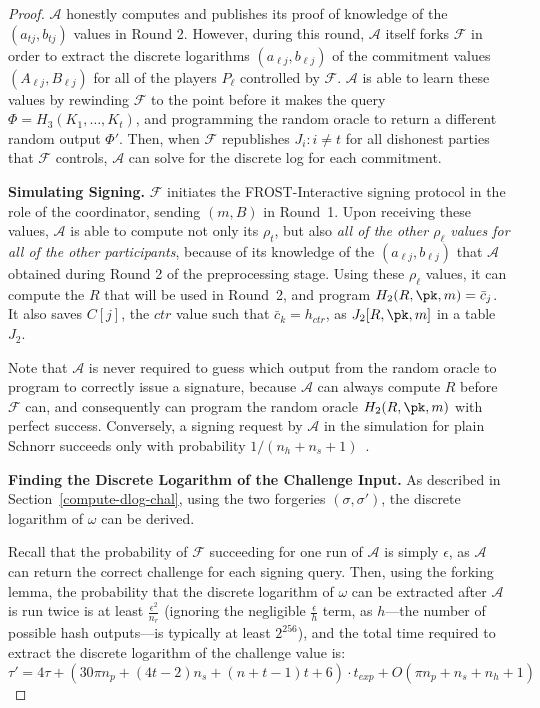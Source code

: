 \begin{proof}
$\mathcal{A}$ honestly computes and  publishes its proof of knowledge of the $(a_{tj}, b_{tj})$ values in Round 2.
However, during this round, $\mathcal{A}$ itself forks $\mathcal{F}$ in order
to extract the discrete logarithms
$(a_{\ell j}, b_{\ell j})$
of the commitment values
$(A_{\ell j}, B_{\ell j})$ for all of the players
$P_\ell$ controlled by $\mathcal{F}$.
$\mathcal{A}$ is able to learn these values
by rewinding $\mathcal{F}$ to the point before it makes the query
$\Phi = H_3(K_1, \dots, K_t)$, and programming the random oracle to
return a different random output $\Phi'$. Then, when $\mathcal{F}$ republishes
$J_i : i \neq t$ for all dishonest parties that $\mathcal{F}$ controls,
$\mathcal{A}$ can solve for the discrete log for each commitment.

\textbf{Simulating Signing.}
$\mathcal{F}$ initiates the FROST-Interactive signing protocol in the role of the coordinator,
sending $(m, B)$ in Round~1. Upon receiving these values, $\mathcal{A}$ is
able to compute not only its $\rho_t$, but also \emph{all of the other $\rho_\ell$
values for all of the other participants}, because of its knowledge of
the $(a_{\ell j}, b_{\ell j})$ that $\mathcal{A}$ obtained during
Round 2 of the preprocessing stage.  Using these $\rho_\ell$ values, it can
compute the $R$ that will be used in Round~2, and program $H_2(R, \pk, m) =
\bar{c}_j$. It also saves $C[j]$, the $ctr$ value such that $\bar{c}_k =
h_{ctr}$, as $J_2[R, \pk, m]$ in a table $J_2$.

Note that $\mathcal{A}$ is never required to guess which output from the random oracle to
program to correctly issue a signature, because $\mathcal{A}$ can
always compute $R$ before $\mathcal{F}$ can, and consequently can program the
random oracle $H_2(R, \pk, m)$ with perfect success.
Conversely, a signing request by $\mathcal{A}$ in the simulation for plain
Schnorr succeeds only with
probability $1/(n_h + n_s + 1)$~\cite{BellareN06}.



\textbf{Finding the Discrete Logarithm of the Challenge Input.} As described in
Section~\ref{compute-dlog-chal}, using the two forgeries $(\sigma, \sigma')$,
the discrete logarithm of $\omega$ can be derived.

Recall that the probability of $\mathcal{F}$ succeeding for one run of
$\mathcal{A}$ is simply $\epsilon$, as $\mathcal{A}$ can return the correct
challenge for each signing query. Then, using the forking lemma, the
probability that the discrete logarithm of
$\omega$ can be extracted after $\mathcal{A}$ is run twice is at least
  $\frac{\epsilon^2}{n_r}$ (ignoring the negligible $\frac{\epsilon}{h}$ term, as $h$---the number of possible hash outputs---is typically at least $2^{256}$), and
the total time required to extract the discrete logarithm of the challenge value is:
\[
  \tau' = 4\tau + (30\pi n_p + (4t-2)n_s + (n+t-1)t + 6) \cdot t_{exp} + O(\pi n_p + n_s + n_h + 1)
\]


\end{proof}
